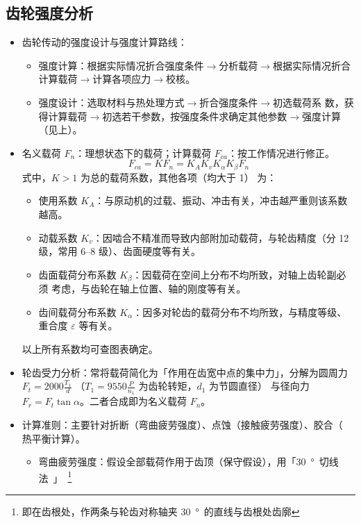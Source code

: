 \documentclass[12pt,a4paper]{article}
\newcommand{\tightlist}{\setlength{\parskip}{0pt}\setlength{\itemsep}{0pt}}
\newcommand{\hint}[1]{\textsf{（#1）}}
\newcommand{\minor}[1]{{\color{gray} #1}}
\newcommand{\then}{$\to$}
\begin{document}
\subsection{齿轮强度分析}
\begin{itemize}\tightlist
    \item 齿轮传动的强度设计与强度计算路线：
    \begin{itemize}\tightlist
        \item 强度计算：根据实际情况折合强度条件\then 分析载荷\then 根据实际情况折合
        计算载荷\then 计算各项应力\then 校核。
        \item \minor{强度设计：选取材料与热处理方式\then 折合强度条件\then 初选载荷系
        数，获得计算载荷\then 初选若干参数，按强度条件求确定其他参数\then 强度计算
        \hint{见上}。}
    \end{itemize}
    \item 名义载荷 $F_n$：理想状态下的载荷；计算载荷 $F_{ca}$：按工作情况进行修正。
    \[F_{ca}=KF_n=K_AK_vK_\alpha K_\beta F_n\]
    式中，$K>1$ 为总的载荷系数，其他各项\hint{均大于 1} 为：
    \begin{itemize}\tightlist
        \item 使用系数 $K_A$：与原动机的过载、振动、冲击有关，冲击越严重则该系数越高。
        \item 动载系数 $K_v$：因啮合不精准而导致内部附加动载荷，与轮齿精度\hint{分 12
        级，常用 6--8 级}、齿面硬度等有关。
        \item 齿面载荷分布系数 $K_\beta$：因载荷在空间上分布不均所致，对轴上齿轮副必须
        考虑，与齿轮在轴上位置、轴的刚度等有关。
        \item 齿间载荷分布系数 $K_\alpha$：因多对轮齿的载荷分布不均所致，与精度等级、
        重合度 $\varepsilon$ 等有关。
    \end{itemize}
    以上所有系数均可查图表确定。
    \item 轮齿受力分析：常将载荷简化为「作用在齿宽中点的集中力」，分解为圆周力 $F_t=
    2000\frac{T_1}{d}$ \hint{$T_1=9550\frac{P}{n_1}$ 为齿轮转矩，$d_1$ 为节圆直径}
    与径向力 $F_r=F_t\tan\alpha$。二者合成即为名义载荷 $F_n$。
    \item 计算准则：主要针对折断\hint{弯曲疲劳强度}、点蚀\hint{接触疲劳强度}、胶合\hint{
    热平衡计算}。
    \begin{itemize}\tightlist
        \item 弯曲疲劳强度：假设全部载荷作用于齿顶\hint{保守假设}，用「\SI{30}\degree
        切线法」
        \footnote{即在齿根处，作两条与轮齿对称轴夹 \SI{30}\degree 的直线与齿根处齿廓
}
\end{itemize}
\end{itemize}
\end{document}
